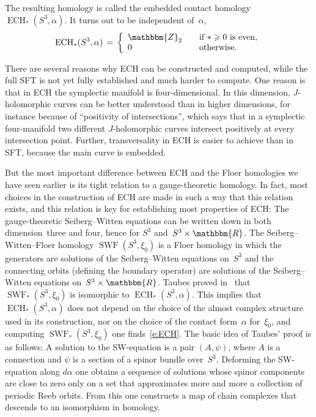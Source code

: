 \documentclass[12pt,twoside]{amsart}
\def\ECH{\operatorname{ECH}}
\def\SWF{\operatorname{SWF}}
\theoremstyle{plain}
\numberwithin{figure}{section}
\numberwithin{equation}{section}
\def\ECH{\operatorname{ECH}}
\def\RR{\mathbbm{R}}
\def\ZZ{\mathbbm{Z}}
\begin{document}
The resulting homology is called the embedded contact homology $\ECH_*(S^3,\alpha)$. 
It turns out to be independent of~$\alpha$,
%
\begin{equation} \label{e:ECH}
\ECH_* (S^3,\alpha) \,=\, 
\left\{\begin{array} {lcl}
\ZZ_2  & &  \mbox{if $* \geqslant 0$ is even}, \\ [0.0em] 
0     & &   \mbox{otherwise} .
\end{array}\right.
\end{equation}
%

There are several reasons why ECH can be constructed and computed, 
while the full SFT is not yet fully established and much harder to compute.
%
One reason is that in ECH the symplectic manifold is four-dimensional.
In this dimension, $J$-holomorphic curves can be better understood than in higher dimensions, 
for instance because of ``positivity of intersections'',
which says that in a symplectic four-manifold two different $J$-holomorphic curves 
intersect positively at every intersection point.
Further, transversality in ECH is easier to achieve than in SFT, because the main curve is embedded.  

But the most important difference between ECH and the Floer homologies we have seen earlier is 
its tight relation to a gauge-theoretic homology. 
In fact, most choices in the construction of ECH are made in such a way that this relation exists, 
and this relation is key for establishing most properties of ECH:
%
The gauge-theoretic Seiberg--Witten equations can be written down in both dimension~three and four, 
hence for $S^3$ and~$S^3 \times \RR$.
The Seiberg--Witten--Floer homology $\SWF (S^3,\xi_0)$ is a Floer homology in which the generators are solutions 
of the Seiberg--Witten equations on~$S^3$ and the connecting orbits (defining the boundary operator)
are solutions of the Seiberg--Witten equations on~$S^3 \times \RR$.
%
Taubes proved in~\cite{Ta07} that $\SWF_* (S^3,\xi_0)$ is isomorphic to $\ECH_* (S^3,\alpha)$.
This implies that $\ECH_*(S^3,\alpha)$ does not depend on the choice of the almost complex structure used 
in its construction,
nor on the choice of the contact form~$\alpha$ for~$\xi_0$, 
and computing $\SWF_* (S^3,\xi_0)$ one finds~\eqref{e:ECH}.
%
The basic idea of Taubes' proof is as follows:
A solution to the SW-equation is a pair $(A, \psi)$, where $A$ is a connection 
and $\psi$ is a section of a spinor bundle over~$S^3$.
Deforming the SW-equation along $d\alpha$ one obtains a sequence of solutions 
whose spinor components are close to zero only
on a set that approximates more and more a collection of periodic Reeb orbits.
From this one constructs a map of chain complexes that descends to 
an isomorphism in homology.
\end{document}
